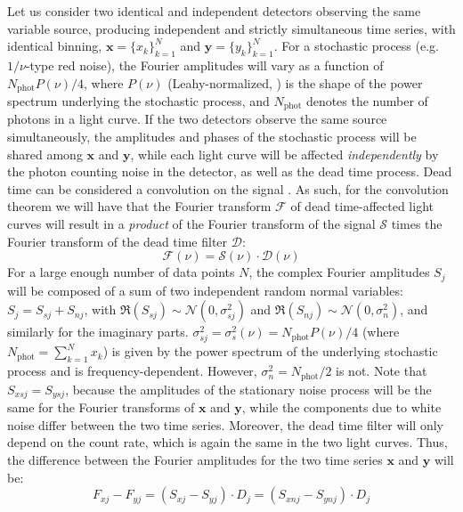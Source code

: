 \documentclass[twocolumn]{aastex61}
\newcommand{\Normal}{\ensuremath{{\mathcal N}}\xspace}
\begin{document}
Let us consider two identical and independent detectors observing the same variable source, producing independent and strictly simultaneous time series, with identical binning, $\mathbf{x} = \{x_k\}_{k=1}^N$ and $\mathbf{y} = \{y_k\}_{k=1}^N$. For a stochastic process (e.g.\ $1/\nu$-type red noise), the Fourier amplitudes will vary as a function of $N_{\mathrm{phot}}P(\nu)/4$, where $P(\nu)$ (Leahy-normalized, \citealt{Leahy+83}) is the shape of the power spectrum underlying the stochastic process, and $N_{\mathrm{phot}}$ denotes the number of photons in a light curve. If the two detectors observe the same source simultaneously, the amplitudes and phases of the stochastic process will be shared among $\mathbf{x}$ and $\mathbf{y}$, while each light curve will be affected \textit{independently} by the photon counting noise in the detector, as well as the dead time process. 
Dead time can be considered a convolution on the signal \citep{Vikhlinin+94}. 
As such, for the convolution theorem we will have that the Fourier transform $\mathcal{F}$ of dead time-affected light curves will result in a \textit{product} of the Fourier transform of the signal $\mathcal{S}$ times the Fourier transform of the dead time filter $\mathcal{D}$:
\begin{equation}
\mathcal{F}(\nu) = \mathcal{S}(\nu)\cdot\mathcal{D}(\nu)
\end{equation}
For a large enough number of data points $N$, the complex Fourier amplitudes $S_j$ will be composed of a sum of two independent random normal variables: $S_j = S_{sj} + S_{nj}$, with $\Re (S_{sj}) \sim \Normal(0, \sigma_{sj}^2)$ and $\Re(S_{nj}) \sim \Normal(0, \sigma_n^2)$, and similarly for the imaginary parts.
$\sigma_{sj}^2 = \sigma_{s}^2(\nu) = N_\mathrm{phot}P(\nu)/4$ (where $N_{\mathrm{phot}} = \sum_{k=1}^{N}{x_k}$) is given by the power spectrum of the underlying stochastic process and is frequency-dependent. However, $\sigma_n^2 = N_\mathrm{phot}/2$ is not. 
Note that $S_{xsj} = S_{ysj}$, because the amplitudes of the stationary noise process will be the same for the Fourier transforms of $\mathbf{x}$ and $\mathbf{y}$, while the components due to white noise differ between the two time series.
Moreover, the dead time filter will only depend on the count rate, which is again the same in the two light curves.
Thus, the difference between the Fourier amplitudes for the two time series $\mathbf{x}$ and $\mathbf{y}$ will be:
\begin{equation}
F_{xj} - F_{yj} = (S_{xj} - S_{yj})\cdot D_j = (S_{xnj} - S_{ynj})\cdot D_j
\end{equation}
\end{document}
